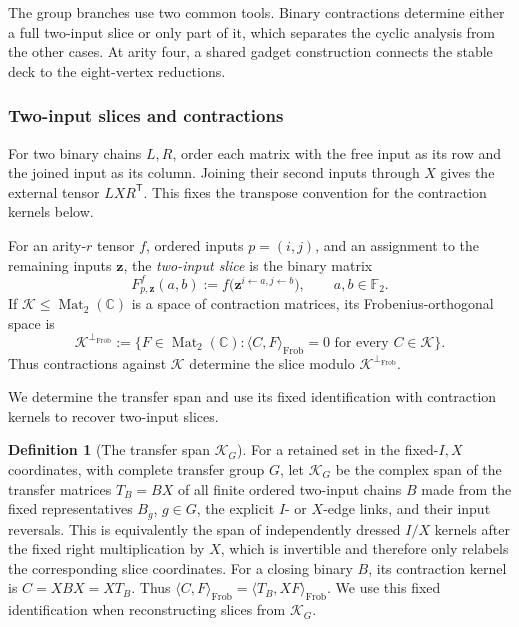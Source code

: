 \documentclass[11pt,letterpaper,onecolumn]{article}
\theoremstyle{plain}
\theoremstyle{definition}
\newtheorem{definition}[definition]{Definition}
\theoremstyle{remark}
\newcommand{\Ftwo}{\mathbb F_2}
\newcommand{\Mat}{\operatorname{Mat}}
\begin{document}
The group branches use two common tools. Binary contractions determine
either a full two-input slice or only part of it, which separates the
cyclic analysis from the other cases. At arity four, a shared gadget
construction connects the stable deck to the eight-vertex reductions.

\subsubsection{Two-input slices and contractions}
\label{subsubsec:two-port-fibres}

For two binary chains \(L,R\), order each matrix with the free input
as its row and the joined input as its column. Joining their second
inputs through \(X\) gives the external tensor \(LXR^{\mathsf T}\).
This fixes the transpose convention for the contraction kernels below.

For an arity-\(r\) tensor \(f\), ordered inputs \(p=(i,j)\), and an assignment to the remaining inputs \({\mathbf z}\), the \emph{two-input slice} is the binary
matrix
\[
 F^f_{p,{\mathbf z}}(a,b):=
 f\bigl({\mathbf z}^{i\leftarrow a,j\leftarrow b}\bigr),
 \qquad a,b\in\Ftwo.
\]
If \(\mathscr K\le\Mat_2(\mathbb C)\) is a space of contraction matrices, its
Frobenius-orthogonal space is
\[
 \mathscr K^{\perp_{\mathrm{Frob}}}:=
 \{F\in\Mat_2(\mathbb C):
   \langle C,F\rangle_{\mathrm{Frob}}=0\text{ for every }C\in\mathscr K\}.
\]
Thus contractions against \(\mathscr K\) determine the slice modulo
\(\mathscr K^{\perp_{\mathrm{Frob}}}\).

We determine the transfer span and use its fixed identification with
contraction kernels to recover two-input slices.

\begin{definition}[The transfer span \(\mathscr K_G\)]
\label{def:effective-kernel-algebra}
For a retained set in the fixed-\(I,X\) coordinates, with
complete transfer group \(G\), let
\(\mathscr K_G\) be the complex span of the transfer matrices
\(T_B=BX\) of all finite ordered two-input chains \(B\) made from the fixed representatives \(B_g\), \(g\in G\), the explicit \(I\)- or
\(X\)-edge links, and their input reversals.  This is equivalently the span
of independently dressed \(I/X\) kernels after the fixed right
multiplication by \(X\), which is invertible and therefore only relabels
the corresponding slice coordinates. For a closing binary \(B\), its
contraction kernel is \(C=XBX=XT_B\). Thus
\(\langle C,F\rangle_{\mathrm{Frob}}=\langle T_B,XF\rangle_{\mathrm{Frob}}\).
We use this fixed identification when reconstructing slices from
\(\mathscr K_G\).
\end{definition}
\end{document}
